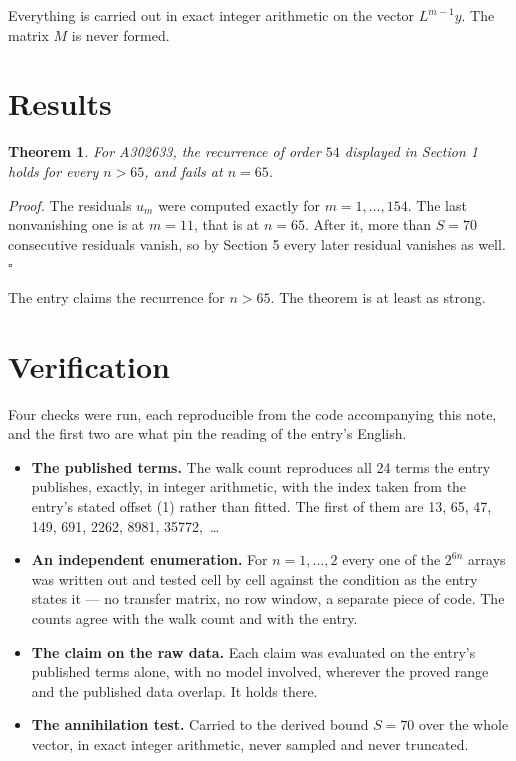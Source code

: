\documentclass[11pt]{article}
\newtheorem{theorem}{Theorem}
\theoremstyle{definition}
\begin{document}
Everything is carried out in exact integer arithmetic on the vector $L^{m-1}y$. The matrix $M$ is never formed.

\section{Results}

\begin{theorem} For A302633, the recurrence of order $54$ displayed in Section 1 holds for every $n > 65$, and fails at $n = 65$.\end{theorem}

{\itshape Proof.} The residuals $u_m$ were computed exactly for $m = 1,\dots,154$. The last nonvanishing one is at $m = 11$, that is at $n = 65$. After it, more than $S = 70$ consecutive residuals vanish, so by Section 5 every later residual vanishes as well. $\square$

The entry claims the recurrence for $n > 65$. The theorem is at least as strong.

\section{Verification}

Four checks were run, each reproducible from the code accompanying this note, and the first two are what pin the reading of the entry's English.

\begin{itemize}

\item {\bfseries The published terms.} The walk count reproduces all 24 terms the entry publishes, exactly, in integer arithmetic, with the index taken from the entry's stated offset (1) rather than fitted. The first of them are 13, 65, 47, 149, 691, 2262, 8981, 35772,~\dots

\item {\bfseries An independent enumeration.} For $n = 1,\dots,2$ every one of the $2^{6n}$ arrays was written out and tested cell by cell against the condition as the entry states it --- no transfer matrix, no row window, a separate piece of code. The counts agree with the walk count and with the entry.

\item {\bfseries The claim on the raw data.} Each claim was evaluated on the entry's published terms alone, with no model involved, wherever the proved range and the published data overlap. It holds there.

\item {\bfseries The annihilation test.} Carried to the derived bound $S = 70$ over the whole vector, in exact integer arithmetic, never sampled and never truncated.

\end{itemize}
\end{document}

